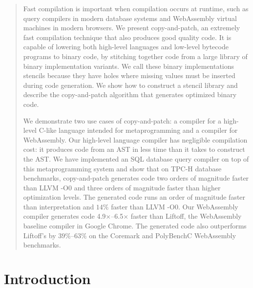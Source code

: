 \documentclass[acmsmall,nonacm,screen]{acmart}\settopmatter{printfolios=true,printccs=true,printacmref=false}
\newcommand{\X}{$\times$}
\begin{document}
\begin{abstract}
    Fast compilation is important when compilation occurs at runtime, such as query compilers in modern database systems and WebAssembly virtual machines in modern browsers. We present copy-and-patch, an extremely fast compilation technique that also produces good quality code. It is capable of lowering both high-level languages and low-level bytecode programs to binary code, by stitching together code from a large library of binary implementation variants. We call these binary implementations stencils because they have holes where missing values must be inserted during code generation. We show how to construct a stencil library and describe the copy-and-patch algorithm that generates optimized binary code.
    
    We demonstrate two use cases of copy-and-patch: a compiler for a high-level C-like language intended for metaprogramming and a compiler for WebAssembly. Our high-level language compiler has negligible compilation cost: it produces code from an AST in less time than it takes to construct the AST. We have implemented an SQL database query compiler on top of this metaprogramming system and show that on TPC-H database benchmarks, copy-and-patch generates code two orders of magnitude faster than LLVM -O0 and three orders of magnitude faster than higher optimization levels. The generated code runs an order of magnitude faster than interpretation and $14\%$ faster than LLVM -O0. Our WebAssembly compiler generates code \num{4.9}\X{}--\num{6.5}\X{} faster than Liftoff, the WebAssembly baseline compiler in Google Chrome. The generated code also outperforms Liftoff's by $39\%$--$63\%$ on the Coremark and PolyBenchC WebAssembly benchmarks.
\end{abstract}


\maketitle

\section{Introduction}
\label{sec:introduction}
\end{document}

